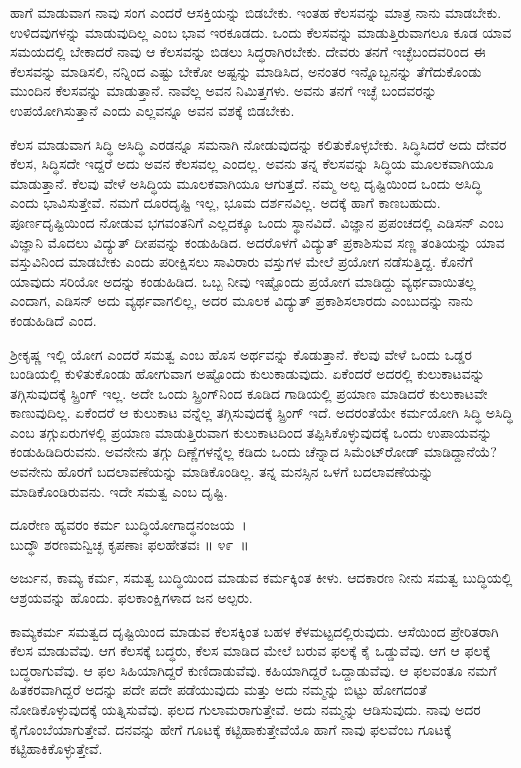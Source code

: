 ಹಾಗೆ ಮಾಡುವಾಗ ನಾವು ಸಂಗ ಎಂದರೆ ಆಸಕ್ತಿಯನ್ನು ಬಿಡಬೇಕು. ಇಂತಹ ಕೆಲಸವನ್ನು ಮಾತ್ರ ನಾನು ಮಾಡಬೇಕು. ಉಳಿದವುಗಳನ್ನು ಮಾಡುವುದಿಲ್ಲ ಎಂಬ ಭಾವ ಇರಕೂಡದು. ಒಂದು ಕೆಲಸವನ್ನು ಮಾಡುತ್ತಿರುವಾಗಲೂ ಕೂಡ ಯಾವ ಸಮಯದಲ್ಲಿ ಬೇಕಾದರೆ ನಾವು ಆ ಕೆಲಸವನ್ನು ಬಿಡಲು ಸಿದ್ಧರಾಗಿರಬೇಕು. ದೇವರು ತನಗೆ ಇಚ್ಛೆಬಂದವರಿಂದ ಈ ಕೆಲಸವನ್ನು ಮಾಡಿಸಲಿ, ನನ್ನಿಂದ ಎಷ್ಟು ಬೇಕೋ ಅಷ್ಟನ್ನು ಮಾಡಿಸಿದ, ಅನಂತರ ಇನ್ನೊಬ್ಬನನ್ನು ತೆಗೆದುಕೊಂಡು ಮುಂದಿನ ಕೆಲಸವನ್ನು ಮಾಡುತ್ತಾನೆ. ನಾವೆಲ್ಲ ಅವನ ನಿಮಿತ್ತಗಳು. ಅವನು ತನಗೆ ಇಚ್ಛೆ ಬಂದವರನ್ನು ಉಪಯೋಗಿಸುತ್ತಾನೆ ಎಂದು ಎಲ್ಲವನ್ನೂ ಅವನ ವಶಕ್ಕೆ ಬಿಡಬೇಕು.

ಕೆಲಸ ಮಾಡುವಾಗ ಸಿದ್ಧಿ ಅಸಿದ್ಧಿ ಎರಡನ್ನೂ ಸಮನಾಗಿ ನೋಡುವುದನ್ನು ಕಲಿತುಕೊಳ್ಳಬೇಕು. ಸಿದ್ಧಿಸಿದರೆ ಅದು ದೇವರ ಕೆಲಸ, ಸಿದ್ಧಿಸದೇ ಇದ್ದರೆ ಅದು ಅವನ ಕೆಲಸವಲ್ಲ ಎಂದಲ್ಲ. ಅವನು ತನ್ನ ಕೆಲಸವನ್ನು ಸಿದ್ಧಿಯ ಮೂಲಕವಾಗಿಯೂ ಮಾಡುತ್ತಾನೆ. ಕೆಲವು ವೇಳೆ ಅಸಿದ್ಧಿಯ ಮೂಲಕವಾಗಿಯೂ ಆಗುತ್ತದೆ. ನಮ್ಮ ಅಲ್ಪ ದೃಷ್ಟಿಯಿಂದ ಒಂದು ಅಸಿದ್ಧಿ ಎಂದು ಭಾವಿಸುತ್ತೇವೆ. ನಮಗೆ ದೂರದೃಷ್ಟಿ ಇಲ್ಲ, ಭೂಮ ದರ್ಶನವಿಲ್ಲ. ಅದಕ್ಕೆ ಹಾಗೆ ಕಾಣಬಹುದು. ಪೂರ್ಣದೃಷ್ಟಿಯಿಂದ ನೋಡುವ ಭಗವಂತನಿಗೆ ಎಲ್ಲದಕ್ಕೂ ಒಂದು ಸ್ಥಾನವಿದೆ. ವಿಜ್ಞಾನ ಪ್ರಪಂಚದಲ್ಲಿ ಎಡಿಸನ್ ಎಂಬ ವಿಜ್ಞಾನಿ ಮೊದಲು ವಿದ್ಯುತ್ ದೀಪವನ್ನು ಕಂಡುಹಿಡಿದ. ಅದರೊಳಗೆ ವಿದ್ಯುತ್ ಪ್ರಕಾಶಿಸುವ ಸಣ್ಣ ತಂತಿಯನ್ನು ಯಾವ ವಸ್ತುವಿನಿಂದ ಮಾಡಬೇಕು ಎಂದು ಪರೀಕ್ಷಿಸಲು ಸಾವಿರಾರು ವಸ್ತುಗಳ ಮೇಲೆ ಪ್ರಯೋಗ ನಡೆಸುತ್ತಿದ್ದ. ಕೊನೆಗೆ ಯಾವುದು ಸರಿಯೋ ಅದನ್ನು ಕಂಡುಹಿಡಿದ. ಒಬ್ಬ ನೀವು ಇಷ್ಟೊಂದು ಪ್ರಯೋಗ ಮಾಡಿದ್ದು ವ್ಯರ್ಥವಾಯಿತಲ್ಲ ಎಂದಾಗ, ಎಡಿಸನ್ ಅದು ವ್ಯರ್ಥವಾಗಲಿಲ್ಲ, ಅದರ ಮೂಲಕ ವಿದ್ಯುತ್ ಪ್ರಕಾಶಿಸಲಾರದು ಎಂಬುದನ್ನು ನಾನು ಕಂಡುಹಿಡಿದೆ ಎಂದ.

ಶ‍್ರೀಕೃಷ್ಣ ಇಲ್ಲಿ ಯೋಗ ಎಂದರೆ ಸಮತ್ವ ಎಂಬ ಹೊಸ ಅರ್ಥವನ್ನು ಕೊಡುತ್ತಾನೆ. ಕೆಲವು ವೇಳೆ ಒಂದು ಒಡ್ಡರ ಬಂಡಿಯಲ್ಲಿ ಕುಳಿತುಕೊಂಡು ಹೋಗುವಾಗ ಅಷ್ಟೊಂದು ಕುಲುಕಾಡುವುದು. ಏಕೆಂದರೆ ಅದರಲ್ಲಿ ಕುಲುಕಾಟವನ್ನು ತಗ್ಗಿಸುವುದಕ್ಕೆ ಸ್ಪ್ರಿಂಗ್ ಇಲ್ಲ. ಅದೇ ಒಂದು ಸ್ಪ್ರಿಂಗ್​ನಿಂದ ಕೂಡಿದ ಗಾಡಿಯಲ್ಲಿ ಪ್ರಯಾಣ ಮಾಡಿದರೆ ಕುಲುಕಾಟವೇ ಕಾಣುವುದಿಲ್ಲ. ಏಕೆಂದರೆ ಆ ಕುಲುಕಾಟ ವನ್ನೆಲ್ಲ ತಗ್ಗಿಸುವುದಕ್ಕೆ ಸ್ಪ್ರಿಂಗ್ ಇದೆ. ಅದರಂತೆಯೇ ಕರ್ಮಯೋಗಿ ಸಿದ್ಧಿ ಅಸಿದ್ಧಿ ಎಂಬ ತಗ್ಗುಏರುಗಳಲ್ಲಿ ಪ್ರಯಾಣ ಮಾಡುತ್ತಿರುವಾಗ ಕುಲುಕಾಟದಿಂದ ತಪ್ಪಿಸಿಕೊಳ್ಳುವುದಕ್ಕೆ ಒಂದು ಉಪಾಯವನ್ನು ಕಂಡುಹಿಡಿದಿರುವನು. ಅವನೇನು ತಗ್ಗು ದಿಣ್ಣೆಗಳನ್ನೆಲ್ಲ ಕಡಿದು ಒಂದು ಚೆನ್ನಾದ ಸಿಮೆಂಟ್​ರೋಡ್ ಮಾಡಿದ್ದಾನೆಯೆ? ಅವನೇನು ಹೊರಗೆ ಬದಲಾವಣೆಯನ್ನು ಮಾಡಿಕೊಂಡಿಲ್ಲ. ತನ್ನ ಮನಸ್ಸಿನ ಒಳಗೆ ಬದಲಾವಣೆಯನ್ನು ಮಾಡಿಕೊಂಡಿರುವನು. ಇದೇ ಸಮತ್ವ ಎಂಬ ದೃಷ್ಟಿ.

\begin{shloka}
ದೂರೇಣ ಹ್ಯವರಂ ಕರ್ಮ ಬುದ್ಧಿಯೋಗಾದ್ಧನಂಜಯ~।\\ಬುದ್ಧೌ ಶರಣಮನ್ವಿಚ್ಛ ಕೃಪಣಾಃ ಫಲಹೇತವಃ \hfill॥ ೪೯~॥
\end{shloka}

\begin{artha}
ಅರ್ಜುನ, ಕಾಮ್ಯ ಕರ್ಮ, ಸಮತ್ವ ಬುದ್ಧಿಯಿಂದ ಮಾಡುವ ಕರ್ಮಕ್ಕಿಂತ ಕೀಳು. ಆದಕಾರಣ ನೀನು ಸಮತ್ವ ಬುದ್ಧಿಯಲ್ಲಿ ಆಶ್ರಯವನ್ನು ಹೊಂದು. ಫಲಕಾಂಕ್ಷಿಗಳಾದ ಜನ ಅಲ್ಪರು.
\end{artha}

ಕಾಮ್ಯಕರ್ಮ ಸಮತ್ವದ ದೃಷ್ಟಿಯಿಂದ ಮಾಡುವ ಕೆಲಸಕ್ಕಿಂತ ಬಹಳ ಕೆಳಮಟ್ಟದಲ್ಲಿರುವುದು. ಆಸೆಯಿಂದ ಪ್ರೇರಿತರಾಗಿ ಕೆಲಸ ಮಾಡುವೆವು. ಆಗ ಕೆಲಸಕ್ಕೆ ಬದ್ಧರು, ಕೆಲಸ ಮಾಡಿದ ಮೇಲೆ ಬರುವ ಫಲಕ್ಕೆ ಕೈ ಒಡ್ಡುವೆವು. ಆಗ ಆ ಫಲಕ್ಕೆ ಬದ್ಧರಾಗುವೆವು. ಆ ಫಲ ಸಿಹಿಯಾಗಿದ್ದರೆ ಕುಣಿದಾಡುವೆವು. ಕಹಿಯಾಗಿದ್ದರೆ ಒದ್ದಾಡುವೆವು. ಆ ಫಲವಂತೂ ನಮಗೆ ಹಿತಕರವಾಗಿದ್ದರೆ ಅದನ್ನು ಪದೇ ಪದೇ ಪಡೆಯುವುದು ಮತ್ತು ಅದು ನಮ್ಮನ್ನು ಬಿಟ್ಟು ಹೋಗದಂತೆ ನೋಡಿಕೊಳ್ಳುವುದಕ್ಕೆ ಯತ್ನಿಸುವೆವು. ಫಲದ ಗುಲಾಮರಾಗುತ್ತೇವೆ. ಅದು ನಮ್ಮನ್ನು ಆಡಿಸುವುದು. ನಾವು ಅದರ ಕೈಗೊಂಬೆಯಾಗುತ್ತೇವೆ. ದನವನ್ನು ಹೇಗೆ ಗೂಟಕ್ಕೆ ಕಟ್ಟಿಹಾಕುತ್ತೇವೆಯೊ ಹಾಗೆ ನಾವು ಫಲವೆಂಬ ಗೂಟಕ್ಕೆ ಕಟ್ಟಿಹಾಕಿಕೊಳ್ಳುತ್ತೇವೆ.

